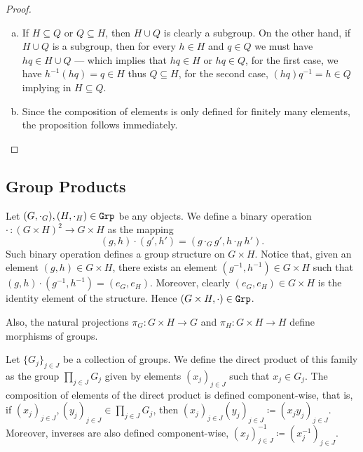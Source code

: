 \begin{proof}
    \begin{enumerate}[(a)]\setlength\itemsep{0em}
        \item If \(H \subseteq Q\) or \(Q \subseteq H\), then \(H \cup Q\) is clearly a
              subgroup. On the other hand, if \(H \cup Q\) is a subgroup, then for every \(h
              \in H\) and \(q \in Q\) we must have \(hq \in H \cup Q\) --- which implies that
              \(hq \in H\) or \(hq \in Q\), for the first case, we have \(h^{-1}(h q) = q
              \in H\) thus \(Q \subseteq H\), for the second case, \((h q) q^{-1} = h \in Q\)
              implying in \(H \subseteq Q\).

        \item Since the composition of elements is only defined for finitely many
              elements, the proposition follows immediately.
    \end{enumerate}
\end{proof}

\subsection{Group Products}

Let \((G, \cdot_G), (H, \cdot_H) \in {\texttt{Grp}}\) be any objects. We define a
binary operation \(\cdot\,: (G \times H)^2 \to G \times H\) as the mapping
\begin{equation}\label{eq: grp-prod-bin}
    (g, h) \cdot (g', h') = (g \cdot_G g', h \cdot_H h').
\end{equation}
Such binary operation defines a group structure on \(G \times H\). Notice that,
given an element \((g, h) \in G \times H\), there exists an element \((g^{-1},
h^{-1}) \in G \times H\) such that \((g, h) \cdot (g^{-1}, h^{-1}) = (e_G,
e_H)\). Moreover, clearly \((e_G, e_H) \in G \times H\) is the identity element
of the structure. Hence \((G \times H, \cdot) \in {\texttt{Grp}}\).

Also, the natural projections \(\pi_G: G \times H \to G\) and \(\pi_H: G \times
H \to H\) define morphisms of groups.

\begin{definition}
    Let \(\{G_{j}\}_{j \in J}\) be a collection of groups. We define the direct
    product of this family as the group \(\prod_{j \in J} G_j\) given by elements
    \((x_j)_{j \in J}\) such that \(x_j \in G_j\). The composition of elements of
    the direct product is defined component-wise, that is, if \((x_j)_{j \in J},
    (y_j)_{j \in J} \in \prod_{j \in J} G_j\), then \((x_j)_{j \in J} (y_j)_{j \in
            J} \coloneq (x_j y_j)_{j \in J}\). Moreover, inverses are also defined
    component-wise, \((x_j)_{j \in J}^{-1} \coloneq (x_j^{-1})_{j \in J}\).
\end{definition}

